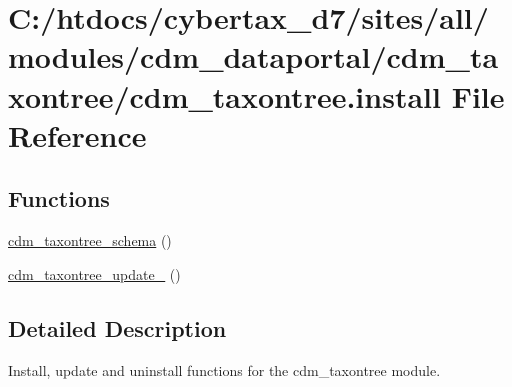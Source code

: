 \hypertarget{cdm__taxontree_8install}{\section{C\-:/htdocs/cybertax\-\_\-d7/sites/all/modules/cdm\-\_\-dataportal/cdm\-\_\-taxontree/cdm\-\_\-taxontree.install File Reference}
\label{cdm__taxontree_8install}
}
\subsection*{Functions}
\begin{DoxyCompactItemize}
\item 
\hyperlink{cdm__taxontree_8install_a3747cb88e3de7f1a11919c5d3953a578}{cdm\-\_\-taxontree\-\_\-schema} ()
\item 
\hyperlink{cdm__taxontree_8install_a3ee61b17fc87fabaccd7c2170c3946dc}{cdm\-\_\-taxontree\-\_\-update\-\_} ()
\end{DoxyCompactItemize}


\subsection{Detailed Description}
Install, update and uninstall functions for the cdm\-\_\-taxontree module. 

